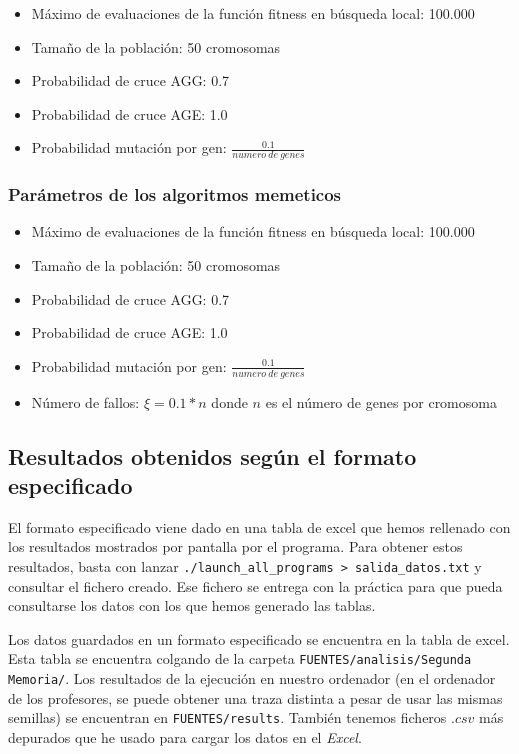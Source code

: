 \documentclass[11pt]{article}
\begin{document}
\begin{itemize}
    \item Máximo de evaluaciones de la función fitness en búsqueda local: 100.000
    \item Tamaño de la población: 50 cromosomas
    \item Probabilidad de cruce AGG: 0.7
    \item Probabilidad de cruce AGE: 1.0
    \item Probabilidad mutación por gen: $\frac{0.1}{numero\ de\ genes}$
\end{itemize}

\subsubsection{Parámetros de los algoritmos memeticos} \label{section:parametros_memeticos}

\begin{itemize}
    \item Máximo de evaluaciones de la función fitness en búsqueda local: 100.000
    \item Tamaño de la población: 50 cromosomas
    \item Probabilidad de cruce AGG: 0.7
    \item Probabilidad de cruce AGE: 1.0
    \item Probabilidad mutación por gen: $\frac{0.1}{numero\ de\ genes}$
    \item Número de fallos: $\xi = 0.1 * n$ donde $n$ es el número de genes por cromosoma
\end{itemize}


\pagebreak

\subsection{Resultados obtenidos según el formato especificado}

El formato especificado viene dado en una tabla de excel que hemos rellenado con los resultados mostrados por pantalla por el programa. Para obtener estos resultados, basta con lanzar \lstinline{./launch_all_programs > salida_datos.txt} y consultar el fichero creado. Ese fichero se entrega con la práctica para que pueda consultarse los datos con los que hemos generado las tablas.

Los datos guardados en un formato especificado se encuentra en la tabla de excel. Esta tabla se encuentra colgando de la carpeta \lstinline{FUENTES/analisis/Segunda Memoria/}. Los resultados de la ejecución en nuestro ordenador (en el ordenador de los profesores, se puede obtener una traza distinta a pesar de usar las mismas semillas) se encuentran en \lstinline{FUENTES/results}. También tenemos ficheros $.csv$ más depurados que he usado para cargar los datos en el \emph{Excel}.
\end{document}
